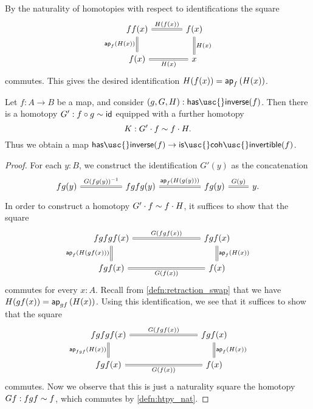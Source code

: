 \begin{constr}
By the naturality of homotopies with respect to identifications the square
\begin{equation*}
\begin{tikzcd}[column sep=large]
ff(x) \arrow[d,swap,equals,"\ap{f}{H(x)}"] \arrow[r,equals,"H(f(x))"] & f(x) \arrow[d,equals,"H(x)"] \\
f(x) \arrow[r,swap,equals,"H(x)"] & x
\end{tikzcd}
\end{equation*}
commutes. This gives the desired identification $H(f(x))=\mathsf{ap}_{f}\left({H(x)}\right)$.
\end{constr}

\begin{lem}\label{lem:coherently-invertible}
  Let $f:A\to B$ be a map, and consider $(g,G,H):\mathsf{has\usc{}inverse}(f)$. Then there is a homotopy $G':f\circ g\sim \mathsf{id}_{}$ equipped with a further homotopy
  \begin{equation*}
    K : G'\cdot f \sim f\cdot H.
  \end{equation*}
  Thus we obtain a map $\mathsf{has\usc{}inverse}(f)\to\mathsf{is\usc{}coh\usc{}invertible}(f)$.
\end{lem}

\begin{proof}
  For each $y:B$, we construct the identification $G'(y)$ as the concatenation
  \begin{equation*}
    \begin{tikzcd}
      fg(y) \arrow[r,equals,"{G(fg(y))}^{-1}"] &[2.5em] fgfg(y) \arrow[r,equals,"\ap{f}{H(g(y))}"] &[2.5em] fg(y) \arrow[r,equals,"G(y)"] & y.
\end{tikzcd}
  \end{equation*}
  In order to construct a homotopy $G'\cdot f\sim f\cdot H$, it suffices to show that the square
  \begin{equation*}
    \begin{tikzcd}[column sep=8em]
      fgfgf(x) \arrow[r,equals,"{G(fgf(x))}"] \arrow[d,equals,swap,"\ap{f}{H(gf(x))}"] & fgf(x) \arrow[d,equals,"\ap{f}{H(x)}"] \\
      fgf(x) \arrow[r,equals,swap,"G(f(x))"] & f(x)
    \end{tikzcd}
  \end{equation*}
  commutes for every $x:A$.
  Recall from \cref{defn:retraction_swap} that we have $H(gf(x))=\mathsf{ap}_{gf}\left({H(x)}\right)$. Using this identification, we see that it suffices to show that the square
  \begin{equation*}
    \begin{tikzcd}[column sep=8em]
      fgfgf(x) \arrow[r,equals,"G(fgf(x))"] \arrow[d,equals,swap,"\ap{fgf}{H(x)}"] & fgf(x) \arrow[d,equals,"\ap{f}{H(x)}"] \\
      fgf(x) \arrow[r,equals,swap,"G(f(x))"] & f(x)
    \end{tikzcd}
  \end{equation*}
  commutes. Now we observe that this is just a naturality square the homotopy $Gf:fgf\sim f$, which commutes by \cref{defn:htpy_nat}.
\end{proof}

